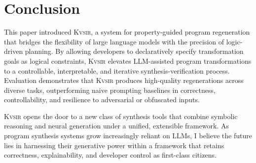 \documentclass[sigplan,review,anonymous,10pt]{acmart}
\newcommand{\sys}{{\scshape Kv{\textalpha}sir}\xspace}
\newcommand{\heading}[1]{\vspace{2pt}\noindent\textbf{\emph{#1}}:\enspace}
\begin{document}
\section{Conclusion}
This paper introduced \sys, a system for property-guided program regeneration
that bridges the flexibility of large language models with the precision of
logic-driven planning.
By allowing developers to declaratively specify
transformation goals as logical constraints, \sys elevates LLM-assisted program
transformations to a controllable, interpretable, and iterative synthesis-verification
process.
Evaluation demonstrates that \sys produces high-quality regenerations
across diverse tasks, outperforming naive prompting baselines in correctness,
controllability, and resilience to adversarial or obfuscated inputs.

\sys opens the door to a new class of synthesis tools that combine symbolic
reasoning and neural generation under a unified, extensible framework.
As program synthesis systems grow increasingly reliant on LLMs, I believe the
future lies in harnessing their generative power within a framework that retains
correctness, explainability, and developer control as first-class citizens.



\end{document}
